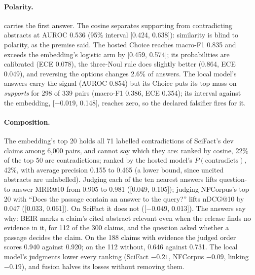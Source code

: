 \documentclass[11pt]{article}
\theoremstyle{definition}
\theoremstyle{plain}
\theoremstyle{remark}
\begin{document}
\paragraph{Polarity.}  carries the first answer. The cosine separates supporting
from contradicting abstracts at AUROC 0.536 (95\% interval [0.424, 0.638]): similarity is blind to
polarity, as the premise said. The hosted Choice reaches macro-F1 0.835 and exceeds the embedding's
logistic arm by [0.459, 0.574]; its probabilities are calibrated (ECE 0.078), the three-Noul rule
does slightly better (0.864, ECE 0.049), and reversing the options changes 2.6\% of answers. The
local model's answers carry the signal (AUROC 0.854) but its Choice puts its top mass on
\emph{supports} for 298 of 339 pairs (macro-F1 0.386, ECE 0.354); its interval against the embedding,
[$-0.019$, 0.148], reaches zero, so the declared falsifier fires for it.

\paragraph{Composition.} The embedding's top 20 holds all 71 labelled contradictions of SciFact's
dev claims among 6{,}000 pairs, and cannot say which they are: ranked by cosine, 22\% of the top 50
are contradictions; ranked by the hosted model's $P(\mathrm{contradicts})$, 42\%, with average
precision 0.155 to 0.465 (a lower bound, since uncited abstracts are unlabelled). Judging each of
the ten nearest answers lifts question-to-answer MRR@10 from 0.905 to 0.981 ([0.049, 0.105]); judging
NFCorpus's top 20 with ``Does the passage contain an answer to the query?'' lifts nDCG@10 by 0.047
([0.033, 0.061]). On SciFact it does not ([$-0.049$, 0.013]). The answers say why: BEIR marks a
claim's cited abstract relevant even when the release finds no evidence in it, for 112 of the 300
claims, and the question asked whether a passage decides the claim. On the 188 claims with
evidence the judged order scores 0.940 against 0.920; on the 112 without, 0.646 against 0.731. The
local model's judgments lower every ranking (SciFact $-0.21$, NFCorpus $-0.09$, linking $-0.19$),
and fusion halves its losses without removing them.
\end{document}
